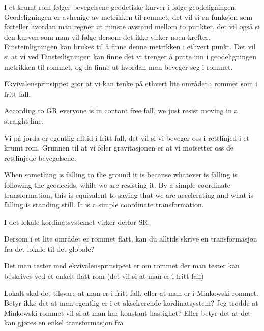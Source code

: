 I et krumt rom følger bevegelsene geodetiske kurver i følge geodeligningen.
Geodeligningen er avhenige av metrikken til rommet, det vil si en funksjon som forteller hvordan man regner ut minste avstand mellom to punkter, det vil også si den kurven som man vil følge dersom det ikke virker noen krefter.
Einsteinligningen kan brukes til å finne denne metrikken i ethvert punkt. Det vil si at vi ved Einsteiligningen kan finne det vi trenger å putte inn i geodeligningen metrikken til rommet, og da finne ut hvordan man beveger seg i rommet. 

Ekvivalensprinsippet gjør at vi kan tenke på ethvert lite området i rommet som i fritt fall. 



According to GR everyone is in contant free fall, we just resist moving in a straight line. 


Vi på jorda er egentlig alltid i fritt fall, det vil si vi beveger oss i rettlinjed i et krumt rom. Grunnen til at vi føler gravitasjonen er at vi motsetter oss de rettlinjede bevegelsene. 

When something is falling to the ground it is because whatever is falling is following the geodecids, while we are resisting it. By a simple coordinate transformation, this is equivalent to saying that we are accelerating and what is falling is standing still. It is a simple coordinate transformation.

I det lokale kordinatsystemet virker derfor SR. 

Dersom i et lite området er rommet flatt, kan du alltids skrive en transformasjon fra det lokale til det globale?

Det man tester med ekvivalensprinsipeet er om rommet der man tester kan beskrives ved et enkelt flatt rom (det vil si at man er i fritt fall)


Lokalt skal det tilsvare at man er i fritt fall, eller at man er i Minkowski rommet. Betyr ikke det at man egentlig er i et akselrerende kordinatsystem? Jeg trodde at Minkowski rommet vil si at man har konstant hastighet? Eller betyr det at det kan gjøres en enkel transformasjon fra 
